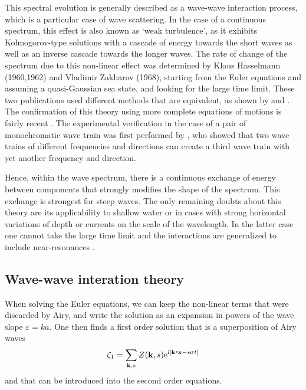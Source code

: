 This spectral evolution is generally described as a wave-wave interaction process, which is a particular case of wave scattering. In the case of a continuous 
spectrum, this effect is also known as `weak turbulence', as it exhibits Kolmogorov-type solutions with a cascade of energy towards the short waves as well as an 
inverse cascade towards the longer waves. The rate of change 
of the spectrum due to this non-linear effect was determined by Klaus
Hasselmann (1960\nocite{Hasselmann1960},1962\nocite{Hasselmann1962}) and Vladimir Zakharov
(1968\nocite{Zakharov1968}), starting from the Euler equations and assuming a quasi-Gaussian sea state, and looking for the large time limit. These two publications used different methods that are equivalent, as shown by \citet[e.g.][]{Elfouhaily&al.2000} and \citet[e.g.][]{Resio&al.2001}.
The confirmation of this theory using more complete equations of motions is fairly recent \citep{Tanaka2001b,Korotkevich&al.2008}. 
The experimental verification in the case of a pair of monochromatic wave train was first performed by \cite{McGoldrick&al.1966}, who showed that two wave trains of different 
frequencies and directions can create a third wave train with yet another frequency and direction. 

Hence, within the wave spectrum, there is a continuous exchange of energy between components that strongly modifies the shape of the spectrum. This exchange is 
strongest for steep waves. The only remaining doubts about this theory are its applicability to shallow water or in cases with strong horizontal variations of depth or currents on the scale of the wavelength. In the latter case one cannot take the large time limit and the interactions are generalized to include near-resonances \citep{Stiassnie2004,Annenkov&Shrira2006}.




\subsection{Wave-wave interation theory}
When solving the Euler equations, we can keep the non-linear terms that were discarded by Airy, 
and write the solution as an expansion in powers of the wave slope $\varepsilon = k a $.  One then finds a first order solution that is a superposition of Airy waves
\begin{equation}
 \zeta_1=\sum_{\mathbf{k},s} Z(\mathbf{k},s) \mathrm{e}^{\mathrm{i} \left[\mathbf{k} \mbox{\boldmath $\cdot$} \mathbf{x} -s \sigma t\right]}
\end{equation}
and that can be introduced into the second order equations. 

